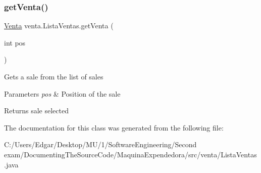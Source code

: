 \subsubsection{\texorpdfstring{get\+Venta()}{getVenta()}}
{\footnotesize\ttfamily \mbox{\hyperlink{classventa_1_1_venta}{Venta}} venta.\+Lista\+Ventas.\+get\+Venta (\begin{DoxyParamCaption}\item[{int}]{pos }\end{DoxyParamCaption})\hspace{0.3cm}{\ttfamily [inline]}}

Gets a sale from the list of sales 
\begin{DoxyParams}{Parameters}
{\em pos} & Position of the sale \\
\hline
\end{DoxyParams}
\begin{DoxyReturn}{Returns}
sale selected 
\end{DoxyReturn}


The documentation for this class was generated from the following file\+:\begin{DoxyCompactItemize}
\item 
C\+:/\+Users/\+Edgar/\+Desktop/\+M\+U/1/\+Software\+Engineering/\+Second exam/\+Documenting\+The\+Source\+Code/\+Maquina\+Expendedora/src/venta/Lista\+Ventas.\+java\end{DoxyCompactItemize}
